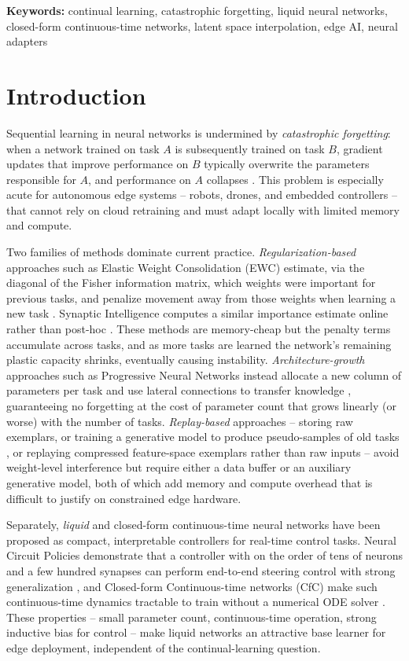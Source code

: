 \documentclass[11pt]{article}
\begin{document}
\noindent\textbf{Keywords:} continual learning, catastrophic forgetting, liquid neural networks, closed-form continuous-time networks, latent space interpolation, edge AI, neural adapters

\section{Introduction}

Sequential learning in neural networks is undermined by \emph{catastrophic forgetting}: when a network trained on task $A$ is subsequently trained on task $B$, gradient updates that improve performance on $B$ typically overwrite the parameters responsible for $A$, and performance on $A$ collapses \cite{mccloskey1989}. This problem is especially acute for autonomous edge systems -- robots, drones, and embedded controllers -- that cannot rely on cloud retraining and must adapt locally with limited memory and compute.

Two families of methods dominate current practice. \emph{Regularization-based} approaches such as Elastic Weight Consolidation (EWC) estimate, via the diagonal of the Fisher information matrix, which weights were important for previous tasks, and penalize movement away from those weights when learning a new task \cite{kirkpatrick2017}. Synaptic Intelligence computes a similar importance estimate online rather than post-hoc \cite{zenke2017}. These methods are memory-cheap but the penalty terms accumulate across tasks, and as more tasks are learned the network's remaining plastic capacity shrinks, eventually causing instability. \emph{Architecture-growth} approaches such as Progressive Neural Networks instead allocate a new column of parameters per task and use lateral connections to transfer knowledge \cite{rusu2016}, guaranteeing no forgetting at the cost of parameter count that grows linearly (or worse) with the number of tasks. \emph{Replay-based} approaches -- storing raw exemplars, or training a generative model to produce pseudo-samples of old tasks \cite{shin2017}, or replaying compressed feature-space exemplars rather than raw inputs \cite{pellegrini2020,rebuffi2017} -- avoid weight-level interference but require either a data buffer or an auxiliary generative model, both of which add memory and compute overhead that is difficult to justify on constrained edge hardware.

Separately, \emph{liquid} and closed-form continuous-time neural networks have been proposed as compact, interpretable controllers for real-time control tasks. Neural Circuit Policies demonstrate that a controller with on the order of tens of neurons and a few hundred synapses can perform end-to-end steering control with strong generalization \cite{lechner2020}, and Closed-form Continuous-time networks (CfC) make such continuous-time dynamics tractable to train without a numerical ODE solver \cite{hasani2022}. These properties -- small parameter count, continuous-time operation, strong inductive bias for control -- make liquid networks an attractive base learner for edge deployment, independent of the continual-learning question.
\end{document}
